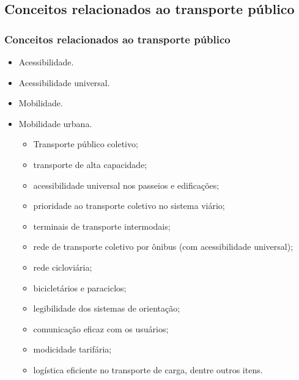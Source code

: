 \documentclass{beamer}
\begin{document}
\subsection{Conceitos relacionados ao transporte público}
\begin{frame}
\frametitle{Conceitos relacionados ao transporte público}
\begin{itemize}
\item Acessibilidade.
\item Acessibilidade universal.
\item Mobilidade.
\item Mobilidade urbana.
\begin{itemize}
\item Transporte público coletivo;
\item  transporte de alta capacidade;
\item  acessibilidade universal nos passeios e edificações;
\item prioridade ao transporte coletivo no sistema viário;
\item terminais de transporte intermodais;
\item rede de transporte coletivo por ônibus (com acessibilidade universal);
\item rede cicloviária;
\item bicicletários e paraciclos;
\item  legibilidade dos sistemas de orientação;
\item comunicação eficaz com os usuários;
\item modicidade tarifária;
\item  logística eficiente no transporte de carga, dentre outros itens.
\end{itemize} 
\end{itemize}
\end{frame}
\end{document}

